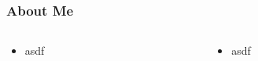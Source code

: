\begin{frame}
	\frametitle{About Me}
	\begin{columns}
		\begin{column}{0.5\textwidth}
		   \begin{itemize}
		   	 \item asdf
		   \end{itemize}
		\end{column}
	    \begin{column}{0.5\textwidth}
	    	\begin{itemize}
	    		\item asdf
	    	\end{itemize}
	    \end{column}
	\end{columns}
\end{frame}